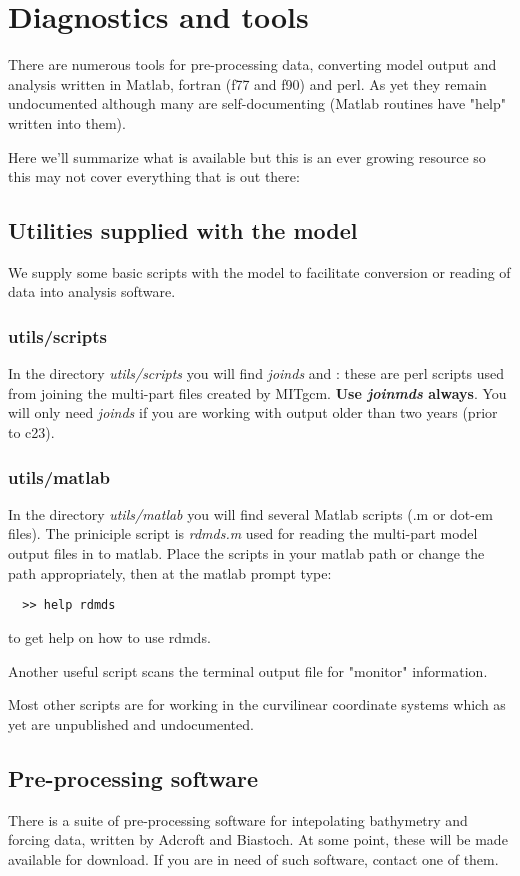 
\chapter{Diagnostics and tools}

There are numerous tools for pre-processing data, converting model
output and analysis written in Matlab, fortran (f77 and f90) and perl.
As yet they remain undocumented although many are self-documenting
(Matlab routines have "help" written into them).

Here we'll summarize what is available but this is an ever growing resource
so this may not cover everything that is out there:

\section{Utilities supplied with the model}

We supply some basic scripts with the model to facilitate conversion or reading
of data into analysis software.

\subsection{utils/scripts}

In the directory {\em utils/scripts} you will find {\em joinds} and {\joinmds}:
these are perl scripts used from joining the multi-part files created by
MITgcm. {\bf Use {\em joinmds} always}. You will only need {\em joinds} if you
are working with output older than two years (prior to c23).

\subsection{utils/matlab}

In the directory {\em utils/matlab} you will find several Matlab scripts
(.m or dot-em files). The priniciple script is {\em rdmds.m} used for reading
the multi-part model output files in to matlab. Place the scripts in your
matlab path or change the path appropriately, then at the matlab prompt type:
\begin{verbatim}
  >> help rdmds
\end{verbatim}
to get help on how to use rdmds.

Another useful script scans the terminal output file for "monitor" information.

Most other scripts are for working in the curvilinear coordinate systems which
as yet are unpublished and undocumented.

\section{Pre-processing software}

There is a suite of pre-processing software for intepolating bathymetry
and forcing data, written by Adcroft and Biastoch. At some point,
these will be made available for download. If you are in need of such
software, contact one of them.
